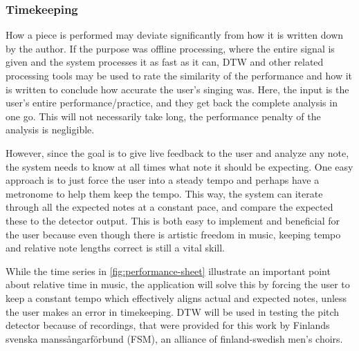\subsubsection{Timekeeping}
How a piece is performed may deviate significantly from how it is written down by the author. If the purpose was offline processing, where the entire signal is given and the system processes it as fast as it can, DTW and other related processing tools may be used to rate the similarity of the performance and how it is written to conclude how accurate the user's singing was. Here, the input is the user's entire performance/practice, and they get back the complete analysis in one go. This will not necessarily take long, the performance penalty of the analysis is negligible.

However, since the goal is to give live feedback to the user and analyze any note, the system needs to know at all times what note it should be expecting. One easy approach is to just force the user into a steady tempo and perhaps have a metronome to help them keep the tempo. This way, the system can iterate through all the expected notes at a constant pace, and compare the expected these to the detector output. This is both easy to implement and beneficial for the user because even though there is artistic freedom in music, keeping tempo and relative note lengths correct is still a vital skill. 

While the time series in \ref{fig:performance-sheet} illustrate an important point about relative time in music, the application will solve this by forcing the user to keep a constant tempo which effectively aligns actual and expected notes, unless the user makes an error in timekeeping. DTW will be used in testing the pitch detector because of recordings, that were provided for this work by Finlands svenska manssångarförbund (FSM), an alliance of finland-swedish men's choirs. 
